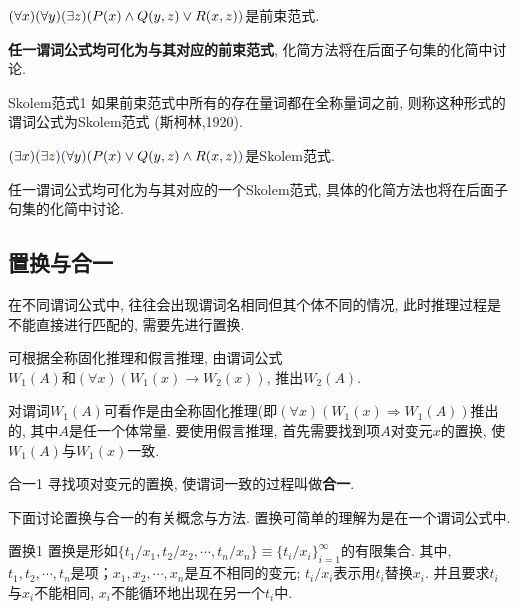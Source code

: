 \begin{example}
  $(\forall x) (\forall y) \textcolor[rgb]{0,0,1}{(}\exists z)(P(x)\wedge Q(y,z)\vee R(x,z)\textcolor[rgb]{0,0,1}{)}$是前束范式.
\end{example}

\textbf{任一谓词公式均可化为与其对应的前束范式}, 化简方法将在后面子句集的化简中讨论.

\begin{mydef}{Skolem范式}{1}
如果前束范式中所有的存在量词都在全称量词之前, 则称这种形式的谓词公式为Skolem范式 (斯柯林,1920).
\end{mydef}

\begin{example}
  $(\exists x) (\exists  z) \textcolor[rgb]{0.00,0.00,1.00}{(}\forall y)(P(x)\vee Q(y,z)\wedge R(x,z)\textcolor[rgb]{0.00,0.00,1.00}{)}$是Skolem范式.
\end{example}

任一谓词公式均可化为与其对应的一个Skolem范式, 具体的化简方法也将在后面子句集的化简中讨论.
\subsection{置换与合一}
在不同谓词公式中, 往往会出现谓词名相同但其个体不同的情况, 此时推理过程是不能直接进行匹配的, 需要先进行置换.

\begin{example}
可根据全称固化推理和假言推理, 由谓词公式$W_1(A) 和 (\forall x)(W_1(x)\rightarrow W_2(x))$, 推出$W_2(A)$.
\end{example}

\begin{remark}
 对谓词$W_1(A)$可看作是由全称固化推理(即$(\forall x)(W_1(x) \Rightarrow  W_1(A))$推出的, 其中$A$是任一个体常量. 要使用假言推理, 首先需要找到项$A$对变元$x$的置换, 使$W_1(A)$与$W_1(x)$一致.
\end{remark}

\begin{mydef}{合一}{1}
    寻找项对变元的置换, 使谓词一致的过程叫做\textcolor[rgb]{0,0,1}{\textbf{合一}}.
\end{mydef}

下面讨论置换与合一的有关概念与方法. 置换可简单的理解为是在一个谓词公式中.
\begin{mydef}{置换}{1}
置换是形如$\{t_1/x_1,t_2/x_2,\cdots,t_n/x_n\}\equiv \{t_i/x_i\}_{i=1}^{\infty}$的有限集合. 其中, $t_1,t_2,\cdots,t_n$是项；$x_1,x_2,\cdots,x_n$是互不相同的变元;
$t_i/x_i$表示用$t_i$替换$x_i$. 并且要求$t_i$与$x_i$不能相同, $x_i$不能循环地出现在另一个$t_i$中.
\end{mydef}

